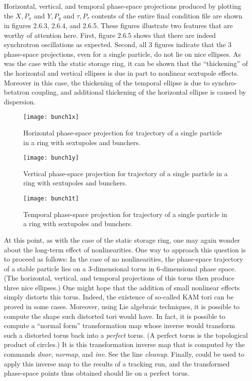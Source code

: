      Horizontal, vertical, and temporal phase-space projections produced by
plotting the $X,P_x$  and $Y,P_y$  and $\tau,P_{\tau}$  contents of the entire final condition
file are shown in figures 2.6.3, 2.6.4, and 2.6.5.  These figures illustrate two features
that are worthy of attention here.  First, figure 2.6.5 shows that there are
indeed synchrotron oscillations as expected.  Second, all 3 figures indicate
that the 3 phase-space projections, even for a single particle, do not lie on
nice ellipses.  As was the case with the static storage ring, it can be shown
that the ``thickening'' of the horizontal and vertical ellipses is due in part
to nonlinear sextupole effects.  Moreover in this case, the thickening of the
temporal ellipse is due to synchro-betatron coupling, and additional
thickening of the horizontal ellipse is caused by dispersion.

\begin{figure}[hbp]
  \centering
  \texttt{[image: bunch1x]}
  \caption{Horizontal phase-space projection for trajectory
       of a single particle in a ring with sextupoles and bunchers.}
\end{figure}

\begin{figure}[hbp]
  \centering
  \texttt{[image: bunch1y]}
  \caption{Vertical phase-space projection for trajectory of a
      single particle in a ring with sextupoles and bunchers.}
\end{figure}

\begin{figure}[htbp]
  \centering
  \texttt{[image: bunch1t]}
  \caption{Temporal phase-space projection for trajectory of
       a single particle in a ring with sextupoles and bunchers.}
\end{figure}

     At this point, as with the case of the static storage ring, one may
again wonder about the long-term effect of nonlinearities. One way to
approach this question is to proceed as follows:  In the case of no
nonlinearities, the phase-space trajectory of a stable particle lies on a
3-dimensional torus in 6-dimensional phase space.  (The horizontal,
vertical, and temporal projections of this torus then produce three nice
ellipses.)  One might hope that the addition of small nonlinear effects
simply distorts this torus.  Indeed, the existence of so-called KAM tori
can be proved in some cases.  Moreover, using Lie algebraic techniques, it
is possible to compute the shape such distorted tori would have.  In fact,
it is possible to compute a ``normal form'' transformation map whose inverse
would transform such a distorted torus back into a {\em perfect } torus.
(A perfect torus is the topological product of circles.)  It is
this transformation inverse map that is computed by the commands
{\em dnor}, {\em normap}, and {\em inv}.  See the line {\em cleanup}.
Finally, \Mary could be used to
apply this inverse map to the results of a tracking run, and the
transformed phase-space points thus obtained should lie on a perfect torus.

